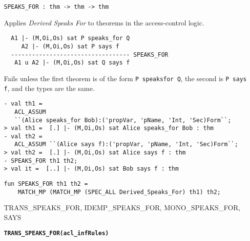 \begin{verbatim}
SPEAKS_FOR : thm -> thm -> thm
\end{verbatim}

\SYNOPSIS
Applies \emph{Derived Speaks For} to theorems in the access-control logic.

\DESCRIBE
\begin{verbatim}
  A1 |- (M,Oi,Os) sat P speaks_for Q
     A2 |- (M,Oi,Os) sat P says f
  ---------------------------------- SPEAKS_FOR
   A1 u A2 |- (M,Oi,Os) sat Q says f
\end{verbatim}

\FAILURE Fails unless the first theorem is of the form \texttt{P
  speaksfor Q}, the second is \texttt{P says f}, and the types are
the same.

\EXAMPLE

\begin{holboxed}
\begin{verbatim}
- val th1 = 
   ACL_ASSUM 
   ``(Alice speaks_for Bob):('propVar, 'pName, 'Int, 'Sec)Form``;
> val th1 =  [.] |- (M,Oi,Os) sat Alice speaks_for Bob : thm
- val th2 = 
   ACL_ASSUM ``(Alice says f):('propVar, 'pName, 'Int, 'Sec)Form``;
> val th2 =  [.] |- (M,Oi,Os) sat Alice says f : thm
- SPEAKS_FOR th1 th2;
> val it =  [..] |- (M,Oi,Os) sat Bob says f : thm
\end{verbatim}
\end{holboxed}

\IMPLEMENTATION
\begin{holboxed}
\begin{verbatim}
fun SPEAKS_FOR th1 th2 =
    MATCH_MP (MATCH_MP (SPEC_ALL Derived_Speaks_For) th1) th2;
\end{verbatim}
\end{holboxed}

\SEEALSO
TRANS\_SPEAKS\_FOR, IDEMP\_SPEAKS\_FOR, MONO\_SPEAKS\_FOR, SAYS
\ENDDOC

\begin{holboxed}
  \begin{Large}
    \textbf{\texttt{TRANS\_SPEAKS_FOR}}\hfill{}\textbf{\texttt{(acl\_infRules)}}
  \end{Large}
\end{holboxed}

